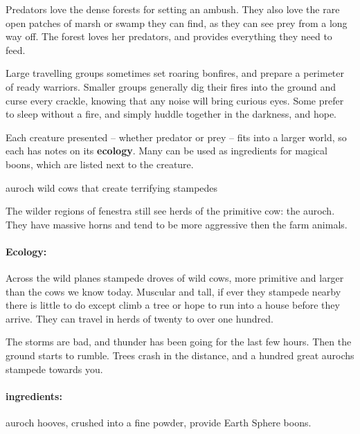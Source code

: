 \begin{multicols}{2}

\noindent
Predators love the dense forests for setting an ambush.
They also love the rare open patches of marsh or swamp they can find, as they can see prey from a long way off.
The forest loves her predators, and provides everything they need to feed.

Large travelling groups sometimes set roaring bonfires, and prepare a perimeter of ready warriors.
Smaller groups generally dig their fires into the ground and curse every crackle, knowing that any noise will bring curious eyes.
Some prefer to sleep without a fire, and simply huddle together in the darkness, and hope.

Each creature presented -- whether predator or prey -- fits into a larger world, so each has notes on its \textbf{ecology}.
Many can be used as \glspl{ingredient} for magical \glspl{boon}, which are listed next to the creature.

  {auroch}%
  {wild cows that create terrifying stampedes}%

The wilder regions of \gls{fenestra} still see herds of the primitive cow: the auroch.
They have massive horns and tend to be more aggressive then the farm animals.


\paragraph{Ecology:} Across the wild planes stampede droves of wild cows, more primitive and larger than the cows we know today.
Muscular and tall, if ever they stampede nearby there is little to do except climb a tree or hope to run into a house before they arrive.
They can travel in herds of twenty to over one hundred.

\begin{boxtext}

  The storms are bad, and thunder has been going for the last few hours.  Then the ground starts to rumble.  Trees crash in the distance, and a hundred great aurochs stampede towards you.

\end{boxtext}

\paragraph{\Glspl{ingredient}:}
auroch hooves, crushed into a fine powder, provide Earth Sphere \glspl{boon}.


\end{multicols}

